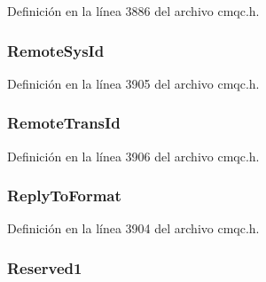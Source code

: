 Definición en la línea 3886 del archivo cmqc.\+h.

\hypertarget{structtag_m_q_c_i_h_aecfc9b97a776b55bf03d40b7ced6c964}{}
\subsubsection[{Remote\+Sys\+Id}]{ Remote\+Sys\+Id}\label{structtag_m_q_c_i_h_aecfc9b97a776b55bf03d40b7ced6c964}


Definición en la línea 3905 del archivo cmqc.\+h.

\hypertarget{structtag_m_q_c_i_h_a5d99588c0aa86d2e42440b3bbd71564a}{}
\subsubsection[{Remote\+Trans\+Id}]{ Remote\+Trans\+Id}\label{structtag_m_q_c_i_h_a5d99588c0aa86d2e42440b3bbd71564a}


Definición en la línea 3906 del archivo cmqc.\+h.

\hypertarget{structtag_m_q_c_i_h_aa0db77dc6a13de85785fa6cde04cb9ec}{}
\subsubsection[{Reply\+To\+Format}]{ Reply\+To\+Format}\label{structtag_m_q_c_i_h_aa0db77dc6a13de85785fa6cde04cb9ec}


Definición en la línea 3904 del archivo cmqc.\+h.

\hypertarget{structtag_m_q_c_i_h_a60e1569f6f67f9059f37f75e08c80258}{}
\subsubsection[{Reserved1}]{ Reserved1}\label{structtag_m_q_c_i_h_a60e1569f6f67f9059f37f75e08c80258}


